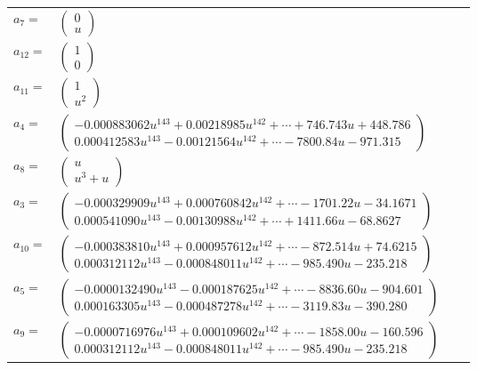 \documentclass[1p]{elsarticle_modified}
\theoremstyle{definition}
\begin{document}
\begin{tabular}{m{7pt} m{180pt} m{7pt} m{180pt} }
\flushright $a_{7}=$&$\begin{pmatrix}0\\u\end{pmatrix}$ \\
\flushright $a_{12}=$&$\begin{pmatrix}1\\0\end{pmatrix}$ \\
\flushright $a_{11}=$&$\begin{pmatrix}1\\u^2\end{pmatrix}$ \\
\flushright $a_{4}=$&$\begin{pmatrix}-0.000883062 u^{143}+0.00218985 u^{142}+\cdots+746.743 u+448.786\\0.000412583 u^{143}-0.00121564 u^{142}+\cdots-7800.84 u-971.315\end{pmatrix}$ \\
\flushright $a_{8}=$&$\begin{pmatrix}u\\u^3+u\end{pmatrix}$ \\
\flushright $a_{3}=$&$\begin{pmatrix}-0.000329909 u^{143}+0.000760842 u^{142}+\cdots-1701.22 u-34.1671\\0.000541090 u^{143}-0.00130988 u^{142}+\cdots+1411.66 u-68.8627\end{pmatrix}$ \\
\flushright $a_{10}=$&$\begin{pmatrix}-0.000383810 u^{143}+0.000957612 u^{142}+\cdots-872.514 u+74.6215\\0.000312112 u^{143}-0.000848011 u^{142}+\cdots-985.490 u-235.218\end{pmatrix}$ \\
\flushright $a_{5}=$&$\begin{pmatrix}-0.0000132490 u^{143}-0.000187625 u^{142}+\cdots-8836.60 u-904.601\\0.000163305 u^{143}-0.000487278 u^{142}+\cdots-3119.83 u-390.280\end{pmatrix}$ \\
\flushright $a_{9}=$&$\begin{pmatrix}-0.0000716976 u^{143}+0.000109602 u^{142}+\cdots-1858.00 u-160.596\\0.000312112 u^{143}-0.000848011 u^{142}+\cdots-985.490 u-235.218\end{pmatrix}$ \\

\end{tabular}
\end{document}

